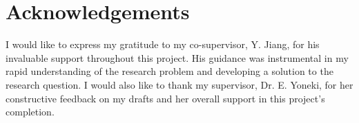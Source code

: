 \chapter*{Acknowledgements}

I would like to express my gratitude to my co-supervisor, Y. Jiang, for his invaluable support throughout this project.
His guidance was instrumental in my rapid understanding of the research problem and developing a solution to the research question.
I would also like to thank my supervisor, Dr. E. Yoneki, for her constructive feedback on my drafts and her overall support in this project's completion.